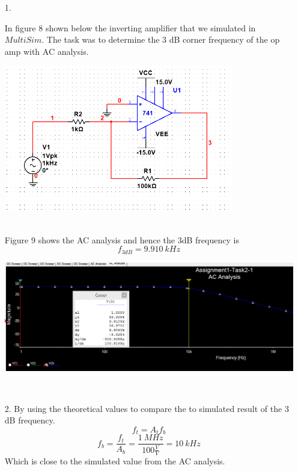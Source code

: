 \documentclass[11pt,a4paper]{article}
\begin{document}
\begin{enumerate}
  \item[1.]
  
  In figure 8 shown below the inverting amplifier that we simulated in $MultiSim$. The task was to determine the 3 dB corner frequency of the op amp with AC analysis.\\
  \begin{minipage}{\linewidth}
  \centering
      \includegraphics[width=10cm]{Task2-1-Circuit}\\
    \end{minipage}\\
    
Figure 9 shows the AC analysis and hence the 3dB  frequency is
$$ f_{3dB} = 9.910 \ kHz $$
  \begin{minipage}{\linewidth}
  \centering
      \includegraphics[width=14cm]{Task2-1-ACAnalysis}\\
    \end{minipage}\\

  \item[2.]
  By using the theoretical values to compare the to simulated result of the 3 dB frequency.
$$f_{t} = A_{t}f_{b}$$
$$ f_{b} = \frac{f_{t}}{A_{b}} = \frac{1\ MHz}{100 \frac{V}{V}} = 10\ kHz $$
Which is close to the simulated value from the AC analysis.  

\end{enumerate}
\pagebreak
\end{document}
